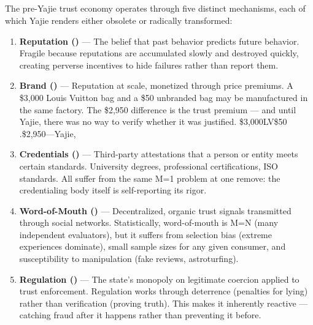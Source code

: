 \documentclass[12pt,a4paper]{article}
\theoremstyle{remark}
\begin{document}
\subsection{}
The pre-Yajie trust economy operates through five distinct mechanisms, each of which 
Yajie renders either obsolete or radically transformed:
\begin{enumerate}[label=\textbf{ \arabic*}, leftmargin=*, itemsep=8pt]
 \item \textbf{Reputation ()} --- The belief that past behavior predicts future behavior. 
 Fragile because reputations are accumulated slowly and destroyed quickly, creating 
 perverse incentives to hide failures rather than report them.
 \item \textbf{Brand ()} --- Reputation at scale, monetized through price premiums. 
 A \$3,000 Louis Vuitton bag and a \$50 unbranded bag may be manufactured in the 
 same factory. The \$2,950 difference is the trust premium --- and until Yajie, 
 there was no way to verify whether it was justified.
\$3,000LV\$50
.\$2,950---Yajie, 
 \item \textbf{Credentials ()} --- Third-party attestations that a person or entity 
 meets certain standards. University degrees, professional certifications, ISO 
 standards. All suffer from the same M=1 problem at one remove: the credentialing 
 body itself is self-reporting its rigor.
 \item \textbf{Word-of-Mouth ()} --- Decentralized, organic trust signals transmitted 
 through social networks. Statistically, word-of-mouth is M=N (many independent 
 evaluators), but it suffers from selection bias (extreme experiences dominate), 
 small sample sizes for any given consumer, and susceptibility to manipulation 
 (fake reviews, astroturfing).
 \item \textbf{Regulation ()} --- The state's monopoly on legitimate coercion applied 
 to trust enforcement. Regulation works through deterrence (penalties for lying) 
 rather than verification (proving truth). This makes it inherently reactive --- 
 catching fraud after it happens rather than preventing it before.
\end{enumerate}
\end{document}

